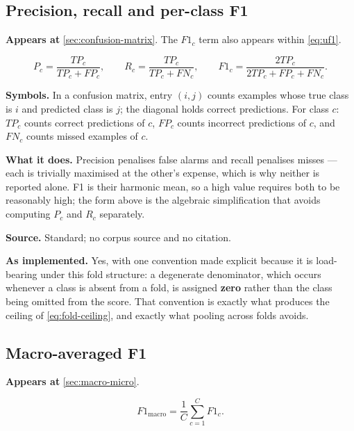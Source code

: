 \subsection{Precision, recall and per-class F1}
\label{eq:prf}

\textbf{Appears at} \autoref{sec:confusion-matrix}. The $F1_c$ term also
appears within \autoref{eq:uf1}.

\[
    P_c=\frac{TP_c}{TP_c+FP_c},\qquad
    R_c=\frac{TP_c}{TP_c+FN_c},\qquad
    F1_c=\frac{2TP_c}{2TP_c+FP_c+FN_c}.
\]

\textbf{Symbols.} In a confusion matrix, entry $(i,j)$ counts examples whose
true class is $i$ and predicted class is $j$; the diagonal holds correct
predictions. For class $c$: $TP_c$ counts correct predictions of $c$, $FP_c$
counts incorrect predictions of $c$, and $FN_c$ counts missed examples of $c$.

\textbf{What it does.} Precision penalises false alarms and recall penalises
misses --- each is trivially maximised at the other's expense, which is why
neither is reported alone. F1 is their harmonic mean, so a high value requires
both to be reasonably high; the form above is the algebraic simplification
that avoids computing $P_c$ and $R_c$ separately.

\textbf{Source.} Standard; no corpus source and no citation.

\textbf{As implemented.} Yes, with one convention made explicit because it is
load-bearing under this fold structure: a degenerate denominator, which occurs
whenever a class is absent from a fold, is assigned \textbf{zero} rather than
the class being omitted from the score. That convention is exactly what
produces the ceiling of \autoref{eq:fold-ceiling}, and exactly what pooling
across folds avoids.

\subsection{Macro-averaged F1}
\label{eq:macro-f1}

\textbf{Appears at} \autoref{sec:macro-micro}.

\[
    F1_{\mathrm{macro}}=\frac1C\sum_{c=1}^{C}F1_c.
\]

